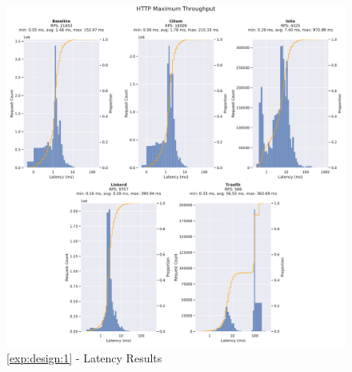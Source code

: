 \begin{figure}[!t]
    \centering
    
    \includegraphics[width=\linewidth]{5_experimental_evaluation/figures/exp_01-latency-results.pdf}

    \caption{\ref{exp:design:1} - Latency Results}
    
    \label{fig:exp:result:01:latency}
\end{figure}



